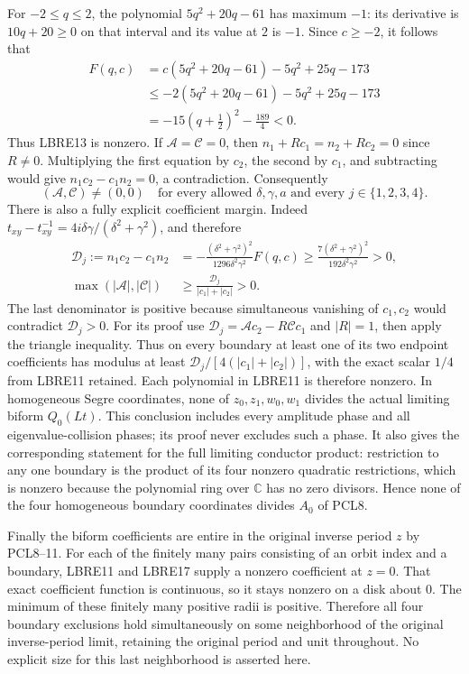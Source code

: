 \documentclass[11pt,a4paper]{article}
\begin{document}
For $-2\le q\le2$, the polynomial $5q^2+20q-61$ has maximum
$-1$: its derivative is $10q+20\ge0$ on that interval and its
value at $2$ is $-1$. Since $c\ge-2$, it follows that
\[
 \begin{split}
 F(q,c)
 &=c(5q^2+20q-61)-5q^2+25q-173\\
 &\le -2(5q^2+20q-61)-5q^2+25q-173\\
 &=-15(q+\tfrac12)^2-\tfrac{189}{4}<0.
 \end{split}\tag{LBRE16}
\]
Thus LBRE13 is nonzero. If $\mathcal A=\mathcal C=0$, then
$n_1+Rc_1=n_2+Rc_2=0$ since $R\ne0$. Multiplying the first
equation by $c_2$, the second by $c_1$, and subtracting would give
$n_1c_2-c_1n_2=0$, a contradiction. Consequently
\[
 (\mathcal A,\mathcal C)\ne(0,0)
 \quad\text{for every allowed }\delta,\gamma,a
 \text{ and every }j\in\{1,2,3,4\}.
 \tag{LBRE17}
\]
There is also a fully explicit coefficient margin. Indeed
$t_{xy}-t_{xy}^{-1}=4i\delta\gamma/(\delta^2+\gamma^2)$, and therefore
\[
 \begin{split}
 \mathcal D_j:=n_1c_2-c_1n_2
  &=-\frac{(\delta^2+\gamma^2)^2}{1296\delta^2\gamma^2}F(q,c)
    \ge\frac{7(\delta^2+\gamma^2)^2}{192\delta^2\gamma^2}>0,\\
 \max(|\mathcal A|,|\mathcal C|)
  &\ge\frac{\mathcal D_j}{|c_1|+|c_2|}>0.
 \end{split}\tag{LBRE18}
\]
The last denominator is positive because simultaneous vanishing of
$c_1,c_2$ would contradict $\mathcal D_j>0$. For its proof use
$\mathcal D_j=\mathcal Ac_2-R\mathcal Cc_1$ and $|R|=1$, then
apply the triangle inequality. Thus on every boundary at least one
of its two endpoint coefficients has modulus at least
$\mathcal D_j/[4(|c_1|+|c_2|)]$, with the exact scalar $1/4$ from
LBRE11 retained.
Each polynomial in LBRE11 is therefore nonzero. In homogeneous
Segre coordinates, none of $z_0,z_1,w_0,w_1$ divides the actual
limiting biform $Q_0(Lt)$. This conclusion includes every amplitude
phase and all eigenvalue-collision phases; its proof never excludes
such a phase. It also gives the corresponding statement for the
full limiting conductor product: restriction to any one boundary
is the product of its four nonzero quadratic restrictions, which
is nonzero because the polynomial ring over $\mathbb C$ has no
zero divisors. Hence none of the four homogeneous boundary
coordinates divides $A_0$ of PCL8.

Finally the biform coefficients are entire in the original inverse
period $z$ by PCL8--11. For each of the finitely many pairs consisting
of an orbit index and a boundary, LBRE11 and LBRE17 supply a
nonzero coefficient at $z=0$. That exact coefficient function is
continuous, so it stays nonzero on a disk about $0$. The minimum
of these finitely many positive radii is positive. Therefore all
four boundary exclusions hold simultaneously on some neighborhood
of the original inverse-period limit, retaining the original
period and unit throughout. No explicit size for this last
neighborhood is asserted here.
\end{document}
